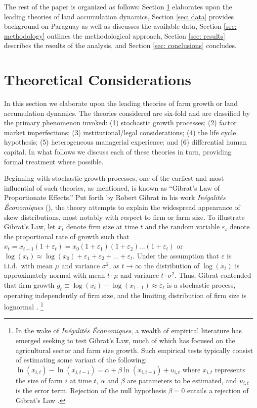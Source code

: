 \documentclass[english]{article}
\begin{document}
The rest of the paper is organized as follows: Section \ref{sec: theories} 
elaborates upon the leading theories of land accumulation dynamics, 
Section \ref{sec: data} provides background on Paraguay as well as discusses 
the available data, Section \ref{sec: methodology} outlines the methodological 
approach, Section \ref{sec: results} describes the results of the analysis, and 
Section \ref{sec: conclusions} concludes.


\section{Theoretical Considerations}
\label{sec: theories}

In this section we elaborate upon the leading theories of farm growth or 
land accumulation dynamics.  
The theories considered are six-fold and are classified by the primary 
phenomenon invoked: (1) stochastic growth processes; 
(2) factor market imperfections; (3) institutional/legal considerations; 
(4) the life cycle hypothesis; (5) heterogeneous managerial experience; and 
(6) differential human capital. 
In what follows we discuss each of these theories in turn, providing formal
treatment where possible.

Beginning with stochastic growth processes, one of the earliest and most 
influential of such theories, as mentioned, is known as ``Gibrat's Law of 
Proportionate Effects.'' 
Put forth by Robert Gibrat in his work 
\emph{In\'{e}galit\'{e}s \'{E}conomiques} (\citeyear{gibrat1931}), the theory
attempts to explain the widespread appearance of skew distributions, most notably 
with respect to firm or farm size.
To illustrate Gibrat's Law, let $x_t$ denote firm size at time $t$ and the random 
variable $\varepsilon_t$ denote the proportional rate of growth such that 
$x_t = x_{t-1}(1 + \varepsilon_t) = x_{0}(1 + \varepsilon_1)(1 + \varepsilon_2) 
\ldots (1 + \varepsilon_t)$ or $\log(x_t) \approx \log(x_{0}) + \varepsilon_1+ 
\varepsilon_2 + \ldots + \varepsilon_t$. 
Under the assumption that $\varepsilon$ is i.i.d.\ with mean $\mu$ and variance 
$\sigma^2$, as $t \to \infty$ the distribution of $\log(x_t)$ is approximately 
normal with mean $t \cdot \mu $ and variance $t \cdot \sigma^2$. 
Thus, Gibrat contended that firm growth $g_t \equiv \log(x_t) - \log(x_{t-1}) 
\approx \varepsilon_t$ is a stochastic process, operating independently of firm size, 
and the limiting distribution of firm size is lognormal \citep{sutton1997}.%
\footnote{In the wake of \emph{In\'{e}galit\'{e}s \'{E}conomiques}, 
a wealth of empirical literature has emerged seeking to test Gibrat's Law, 
much of which has focused on the agricultural sector and farm size growth. 
Such empirical tests typically consist of estimating some variant of the following: 
$\ln(x_{i,t}) - \ln(x_{i,t-1}) = \alpha + \beta \ln(x_{i,t-1}) + u_{i,t}$ where 
$x_{i,t}$ represents the size of farm $i$ at time $t$, $\alpha$ and $\beta$ are 
parameters to be estimated, and $u_{i,t}$ is the error term. 
Rejection of the null hypothesis $\beta=0$ entails a rejection of Gibrat's Law \citep{weiss1999}.} 
\end{document}
